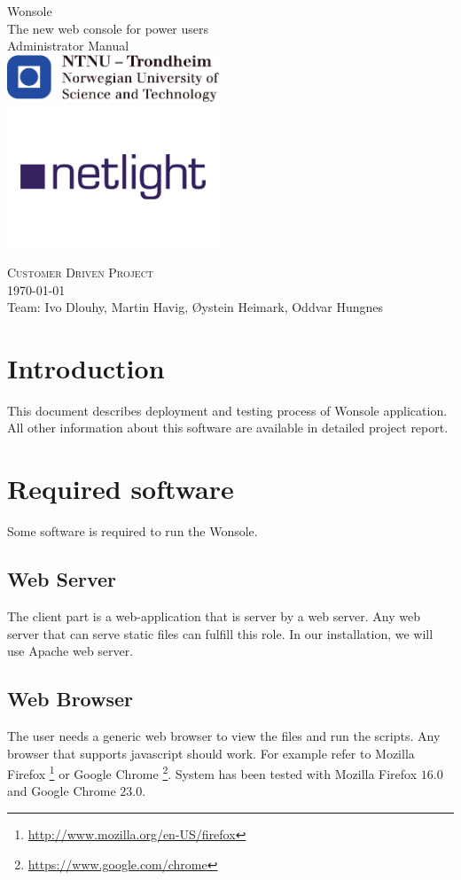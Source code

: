 \documentclass[10pt,a4paper,oneside]{report}
\begin{document}
\thispagestyle{empty}
\begin{center}
	{\Huge Wonsole} \\
	\medskip
	{\LARGE The new web console for power users} \\ 
	\bigskip
	{\Huge Administrator Manual} \\ 
	\includegraphics[width=2.5in]{image/logo-ntnu.pdf} \\
	\includegraphics[width=2.5in]{image/logo-netlight.png}
\end{center}
{\Large \textsc{Customer Driven Project}} \\
{\large \today \\Team: Ivo Dlouhy, Martin Havig, Øystein Heimark, Oddvar Hungnes}
\newpage


\setcounter{tocdepth}{1}
\tableofcontents
\clearpage
\chapter{Introduction}
This document describes deployment and testing process of Wonsole application.
All other information about this software are available in detailed project
report.
\chapter{Required software}
Some software is required to run the Wonsole. 
\section{Web Server}
The client part is a web-application that is server by a web server. Any web
server that can serve static files can fulfill this role. In our installation,
we will use Apache web server.

\section{Web Browser}
The user needs a generic web browser to view the files and run the scripts. Any
browser that supports javascript should work. For example refer to Mozilla
Firefox \footnote{\url{http://www.mozilla.org/en-US/firefox}} or Google Chrome
\footnote{\url{https://www.google.com/chrome}}. System has been tested with
Mozilla Firefox $16.0$ and Google Chrome $23.0$. 
\end{document}
